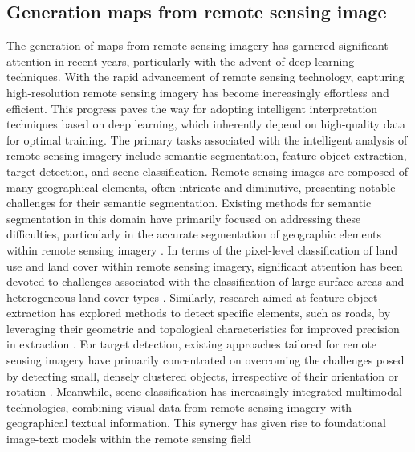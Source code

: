 \subsection{Generation maps from remote sensing image}
The generation of maps from remote sensing imagery has garnered significant attention in recent years, particularly with the advent of deep learning techniques. With the rapid advancement of remote sensing technology, capturing high-resolution remote sensing imagery has become increasingly effortless and efficient. This progress paves the way for adopting intelligent interpretation techniques based on deep learning, which inherently depend on high-quality data for optimal training. The primary tasks associated with the intelligent analysis of remote sensing imagery include semantic segmentation, feature object extraction, target detection, and scene classification. Remote sensing images are composed of many geographical elements, often intricate and diminutive, presenting notable challenges for their semantic segmentation. Existing methods for semantic segmentation in this domain have primarily focused on addressing these difficulties, particularly in the accurate segmentation of geographic elements within remote sensing imagery \cite{Wang2023UPerNetConvNeXtSemantic,Ma2024MultilevelMultimodalFusion,Zhang2024RSAMSegSAMbasedApproach,Toker2024SatSynthAugmentingImageMask,Zhao2023CDDFuseCorrelationDrivenDualBranch,Peng2023DiffusionbasedImageTranslation,Lu2023ScoreSegLeveragingScorebased,Ayala2023Diffusionmodelsremote,Chen2021SelfAttentionReconstructionBias,Cheng2022MaskedAttentionMaskTransformer,Shen2022Highqualitysegmentation,Jiang2020RWSNetsemanticsegmentation}. In terms of the pixel-level classification of land use and land cover within remote sensing imagery, significant attention has been devoted to challenges associated with the classification of large surface areas and heterogeneous land cover types \cite{Yao2023ExtendedVisionTransformer,Wang2023DSViTDynamicallyScalable,Chen2023SparseViTRevisitingActivation,Li2024LearningHolisticallyDetect,Zhao2024RSmambalargeremote,Guo2022ISDNetIntegratingShallow,Shen2022Highqualitysegmentation,Xi2021WideSlidingWindow}. Similarly, research aimed at feature object extraction has explored methods to detect specific elements, such as roads, by leveraging their geometric and topological characteristics for improved precision in extraction \cite{Luc2016SemanticSegmentationusing,Chen2021ReconstructionBiasUNet}. For target detection, existing approaches tailored for remote sensing imagery have primarily concentrated on overcoming the challenges posed by detecting small, densely clustered objects, irrespective of their orientation or rotation \cite{Yang2019SCRDetMoreRobust,Ding2019LearningRoITransformer,Yin2020AirportDetectionBased,Li2021SeMoYOLOMultiscaleObject,Han2021ReDetRotationEquivariantDetector,Xia2024ViTCoMerVisionTransformer}. Meanwhile, scene classification has increasingly integrated multimodal technologies, combining visual data from remote sensing imagery with geographical textual information. This synergy has given rise to foundational image-text models within the remote sensing field 